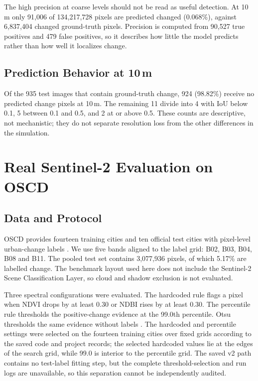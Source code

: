\documentclass[conference]{IEEEtran}
\begin{document}
The high precision at coarse levels should not be read as useful detection. At
10\,m only 91,006 of 134,217,728 pixels are predicted changed (0.068\%), against
6,837,404 changed ground-truth pixels. Precision is computed from 90,527 true
positives and 479 false positives, so it describes how little the model predicts
rather than how well it localizes change.

\subsection{Prediction Behavior at 10\,m}
Of the 935 test images that contain ground-truth change, 924 (98.82\%) receive
no predicted change pixels at 10\,m. The remaining 11 divide into 4 with IoU
below 0.1, 5 between 0.1 and 0.5, and 2 at or above 0.5. These counts are
descriptive, not mechanistic; they do not separate resolution loss from the
other differences in the simulation.

\section{Real Sentinel-2 Evaluation on OSCD}
\subsection{Data and Protocol}
OSCD provides fourteen training cities and ten official test cities with
pixel-level urban-change labels \cite{daudt2018oscd}. We use five
bands aligned to the label grid: B02, B03, B04, B08 and B11. The pooled test set
contains 3,077,936 pixels, of which 5.17\% are labelled change. The benchmark
layout used here does not include the Sentinel-2 Scene Classification Layer, so
cloud and shadow exclusion is not evaluated.

Three spectral configurations were evaluated. The hardcoded rule flags a pixel
when NDVI drops by at least 0.30 or NDBI rises by at least 0.30. The percentile
rule thresholds the positive-change evidence at the 99.0th percentile. Otsu
thresholds the same evidence without labels \cite{otsu1979threshold}. The
hardcoded and percentile settings were selected on the fourteen training cities
over fixed grids according to the saved code and project records; the selected
hardcoded values lie at the edges of the search grid, while 99.0 is interior to
the percentile grid. The saved v2 path contains no test-label fitting step, but
the complete threshold-selection and run logs are unavailable, so this
separation cannot be independently audited.
\end{document}
